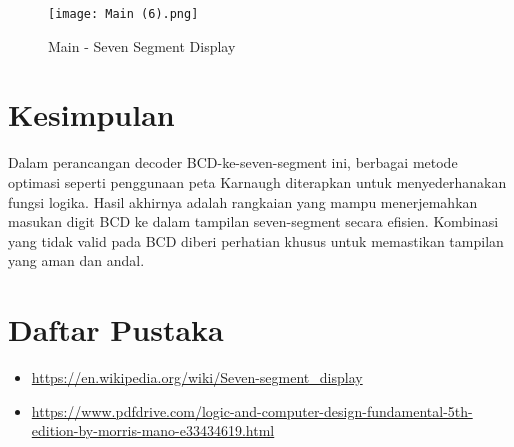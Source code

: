 \documentclass{article}
\begin{document}
\begin{figure}[h!]
    \centering
    \texttt{[image: Main (6).png]}
    \caption{Main - Seven Segment Display}
    \label{fig:enter-label}
\end{figure}

\pagebreak

\section{Kesimpulan}

Dalam perancangan decoder BCD-ke-seven-segment ini, berbagai metode optimasi seperti penggunaan peta Karnaugh diterapkan untuk menyederhanakan fungsi logika. Hasil akhirnya adalah rangkaian yang mampu menerjemahkan masukan digit BCD ke dalam tampilan seven-segment secara efisien. Kombinasi yang tidak valid pada BCD diberi perhatian khusus untuk memastikan tampilan yang aman dan andal.

\section{Daftar Pustaka}

\begin{itemize}
    \item \url{https://en.wikipedia.org/wiki/Seven-segment_display}
    \item \url{https://www.pdfdrive.com/logic-and-computer-design-fundamental-5th-edition-by-morris-mano-e33434619.html}
\end{itemize}
\end{document}
